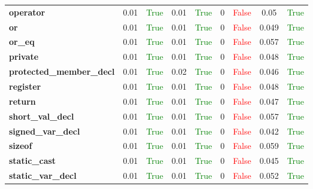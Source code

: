 \documentclass{article}
\begin{document}
\begin{xltabular}{\textwidth}{lcccccccc}
\textbf{{\fontsize{10}{12}\selectfont operator}}& 0.01&\textcolor{green}{True}& 0.01&\textcolor{green}{True}& 0&\textcolor{red}{False}& 0.05&\textcolor{green}{True} \\[0.5ex]
\textbf{{\fontsize{10}{12}\selectfont or}}& 0.01&\textcolor{green}{True}& 0.01&\textcolor{green}{True}& 0&\textcolor{red}{False}& 0.049&\textcolor{green}{True} \\[0.5ex]
\textbf{{\fontsize{10}{12}\selectfont or\_eq}}& 0.01&\textcolor{green}{True}& 0.01&\textcolor{green}{True}& 0&\textcolor{red}{False}& 0.057&\textcolor{green}{True} \\[0.5ex]
\textbf{{\fontsize{10}{12}\selectfont private}}& 0.01&\textcolor{green}{True}& 0.01&\textcolor{green}{True}& 0&\textcolor{red}{False}& 0.048&\textcolor{green}{True} \\[0.5ex]
\textbf{{\fontsize{10}{12}\selectfont protected\_member\_decl}}& 0.01&\textcolor{green}{True}& 0.02&\textcolor{green}{True}& 0&\textcolor{red}{False}& 0.046&\textcolor{green}{True} \\[0.5ex]
\textbf{{\fontsize{10}{12}\selectfont register}}& 0.01&\textcolor{green}{True}& 0.01&\textcolor{green}{True}& 0&\textcolor{red}{False}& 0.048&\textcolor{green}{True} \\[0.5ex]
\textbf{{\fontsize{10}{12}\selectfont return}}& 0.01&\textcolor{green}{True}& 0.01&\textcolor{green}{True}& 0&\textcolor{red}{False}& 0.047&\textcolor{green}{True} \\[0.5ex]
\textbf{{\fontsize{10}{12}\selectfont short\_val\_decl}}& 0.01&\textcolor{green}{True}& 0.01&\textcolor{green}{True}& 0&\textcolor{red}{False}& 0.057&\textcolor{green}{True} \\[0.5ex]
\textbf{{\fontsize{10}{12}\selectfont signed\_var\_decl}}& 0.01&\textcolor{green}{True}& 0.01&\textcolor{green}{True}& 0&\textcolor{red}{False}& 0.042&\textcolor{green}{True} \\[0.5ex]
\textbf{{\fontsize{10}{12}\selectfont sizeof}}& 0.01&\textcolor{green}{True}& 0.01&\textcolor{green}{True}& 0&\textcolor{red}{False}& 0.059&\textcolor{green}{True} \\[0.5ex]
\textbf{{\fontsize{10}{12}\selectfont static\_cast}}& 0.01&\textcolor{green}{True}& 0.01&\textcolor{green}{True}& 0&\textcolor{red}{False}& 0.045&\textcolor{green}{True} \\[0.5ex]
\textbf{{\fontsize{10}{12}\selectfont static\_var\_decl}}& 0.01&\textcolor{green}{True}& 0.01&\textcolor{green}{True}& 0&\textcolor{red}{False}& 0.052&\textcolor{green}{True} \\[0.5ex]

\end{xltabular}
\end{document}
